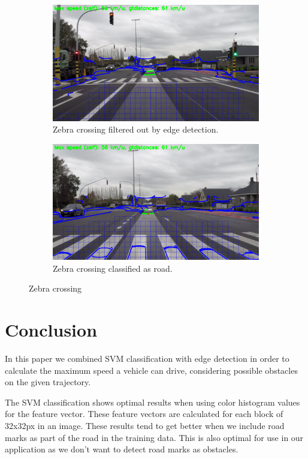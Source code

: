 \documentclass[runningheads,a4paper]{llncs}
\begin{document}
\begin{figure}[H]
\centering
\begin{subfigure}[t]{.5\textwidth}
  \centering
  \includegraphics[width=.9\textwidth]{fig/zebra_edge_filtered.png}
  \caption{Zebra crossing filtered out by edge detection.}
  \label{zebra-1}
\end{subfigure}%
\begin{subfigure}[t]{.5\textwidth}
  \centering
  \includegraphics[width=.9\textwidth]{fig/zebra_road_filtered.png}
  \caption{Zebra crossing classified as road.}
  \label{zebra-2}
\end{subfigure}
\caption{Zebra crossing\label{zebra}}
\end{figure}

\section{Conclusion}
In this paper we combined SVM classification with edge detection in order to calculate the maximum speed a vehicle can drive, considering possible obstacles on the given trajectory.

The SVM classification shows optimal results when using color histogram values for the feature vector. These feature vectors are calculated for each block of 32x32px in an image.
These results tend to get better when we include road marks as part of the road in the training data. This is also optimal for use in our application as we don't want to detect road marks as obstacles.
\end{document}
